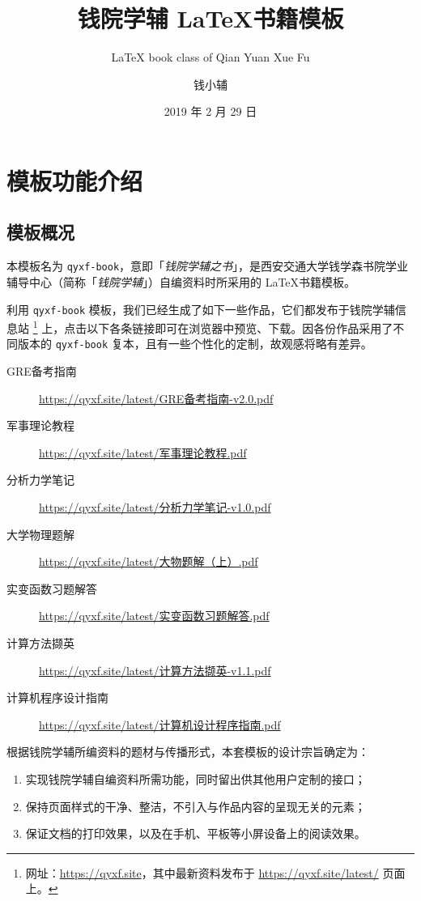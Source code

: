 \documentclass[
  10pt,
  twoside,
  openany,
  b5paper, %
  colorscheme = basic %
]{qyxf-book}
\title{钱院学辅 \LaTeX 书籍模板}
\subtitle{\LaTeX{} book class of Qian Yuan Xue Fu}  %
\author{钱小辅}
\date{2019 年 2 月 29 日}
\begin{document}
\maketitle

\tableofcontents

\chapter{模板功能介绍}

\section{模板概况}

本模板名为 \verb|qyxf-book|，意即「\emph{钱院学辅之书}」，是西安交通大学钱学森书院学业辅导中心（简称「\emph{钱院学辅}」）自编资料时所采用的 \LaTeX 书籍模板。

利用 \verb|qyxf-book| 模板，我们已经生成了如下一些作品，它们都发布于钱院学辅信息站
\footnote{网址：\url{https://qyxf.site}，其中最新资料发布于 \url{https://qyxf.site/latest/} 页面上。}
上，点击以下各条链接即可在浏览器中预览、下载。因各份作品采用了不同版本的 \verb|qyxf-book| 复本，且有一些个性化的定制，故观感将略有差异。

\begin{tcolorbox}
  \begin{description}
    \item [GRE备考指南] \url{https://qyxf.site/latest/GRE备考指南-v2.0.pdf}
    \item [军事理论教程] \url{https://qyxf.site/latest/军事理论教程.pdf}
    \item [分析力学笔记] \url{https://qyxf.site/latest/分析力学笔记-v1.0.pdf}
    \item [大学物理题解] \url{https://qyxf.site/latest/大物题解（上）.pdf}
    \item [实变函数习题解答] \url{https://qyxf.site/latest/实变函数习题解答.pdf}
    \item [计算方法撷英] \url{https://qyxf.site/latest/计算方法撷英-v1.1.pdf}
    \item [计算机程序设计指南] \url{https://qyxf.site/latest/计算机设计程序指南.pdf}
  \end{description}
\end{tcolorbox}

根据钱院学辅所编资料的题材与传播形式，本套模板的设计宗旨确定为：
\begin{enumerate}
  \item 实现钱院学辅自编资料所需功能，同时留出供其他用户定制的接口；
  \item 保持页面样式的干净、整洁，不引入与作品内容的呈现无关的元素；
  \item 保证文档的打印效果，以及在手机、平板等小屏设备上的阅读效果。
\end{enumerate}
\end{document}
